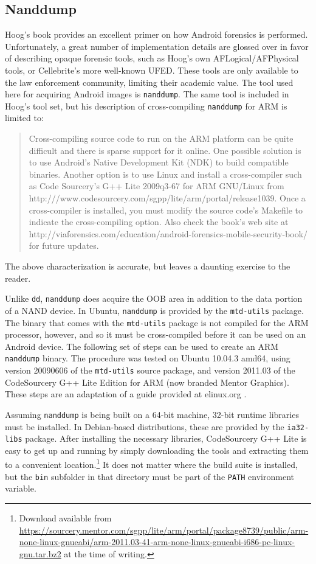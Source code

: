 \subsection{Nanddump}
Hoog's book \cite{hoog} provides an excellent primer on how Android forensics is performed.  Unfortunately, a great number of
implementation details are glossed over in favor of describing opaque forensic tools, such as Hoog's own AFLogical/AFPhysical tools,
or Cellebrite's more well-known UFED. These tools are only available to the law enforcement community, limiting their academic
value. The tool used here for acquiring Android images is \texttt{nanddump}. The same tool is included in Hoog's tool set, but his
description of cross-compiling \texttt{nanddump} for ARM is limited to: 
\begin{quote}
Cross-compiling source code to run on the ARM platform can be quite difficult and there is sparse support for it
online.  One possible solution is to use Android's Native Development Kit (NDK) to build compatible binaries.  Another option is to
use Linux and install a cross-compiler such as Code Sourcery's G++ Lite 2009q3-67 for ARM GNU/Linux from
http:///www.codesourcery.com/sgpp/lite/arm/portal/release1039.  Once a cross-compiler is installed, you must modify the source
code's Makefile to indicate the cross-compiling option.  Also check the book's web site at
http://viaforensics.com/education/android-forensics-mobile-security-book/ for future updates. \cite{hoog}
\end{quote}
The above characterization is accurate, but leaves a daunting exercise to the reader. 

Unlike \texttt{dd}, \texttt{nanddump} does acquire the OOB area in addition to the data portion of a NAND device.  In Ubuntu,
\texttt{nanddump} is provided by the \texttt{mtd-utils} package.  The binary that comes with the \texttt{mtd-utils} package is not
compiled for the ARM processor, however, and so it must be cross-compiled before it can be used on an Android device.  The following
set of steps can be used to create an ARM \texttt{nanddump} binary.  The procedure was tested on Ubuntu 10.04.3 amd64, using version
20090606 of the \texttt{mtd-utils} source package, and version 2011.03 of the CodeSourcery G++ Lite Edition for ARM (now branded
Mentor Graphics).  These steps are an adaptation of a guide provided at elinux.org \cite{compilingmtd}.

Assuming \texttt{nanddump} is being built on a 64-bit machine, 32-bit runtime libraries must be installed.  In Debian-based
distributions, these are provided by the \texttt{ia32-libs} package.  After installing the necessary libraries, CodeSourcery G++ Lite
is easy to get up and running by simply downloading the tools and extracting them to a convenient location.\footnote{Download available
from
\url{https://sourcery.mentor.com/sgpp/lite/arm/portal/package8739/public/arm-none-linux-gnueabi/arm-2011.03-41-arm-none-linux-gnueabi-i686-pc-linux-gnu.tar.bz2}
at the time of writing.} It does not matter where the build suite is installed, but the \texttt{bin} subfolder in that directory
must be part of the \texttt{PATH} environment variable.


